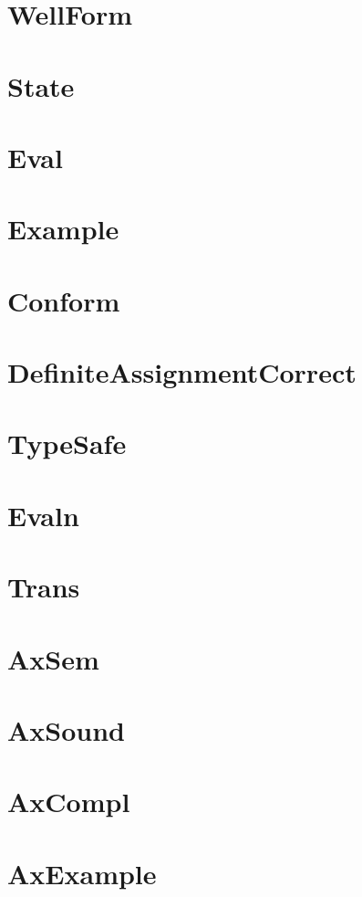 \documentclass[11pt,a4paper]{book}
\begin{document}
\chapter{WellForm}


\chapter{State}
    

\chapter{Eval}
          

\chapter{Example}
  

\chapter{Conform}
       

\chapter{DefiniteAssignmentCorrect}


\chapter{TypeSafe}


\chapter{Evaln}
         

\chapter{Trans}
         

\chapter{AxSem}
      

\chapter{AxSound}
    

\chapter{AxCompl}
    

\chapter{AxExample}
  

%
%
\end{document}

